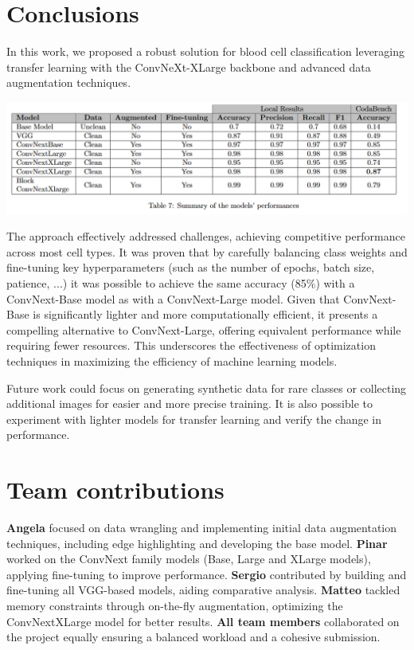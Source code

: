 \documentclass[10pt]{article}
\begin{document}
\begin{multicols}{2}
        

    \section{Conclusions}
    
    In this work, we proposed a robust solution for blood cell classification leveraging transfer learning with the ConvNeXt-XLarge backbone and advanced data augmentation techniques. 
    
    \begin{center}
        \includegraphics[width=\textwidth]{images/table.png} 
        \label{fig:Performance}
    \end{center}

    
    The approach effectively addressed challenges, achieving competitive performance across most cell types.
    It was proven that by carefully balancing class weights and fine-tuning key hyperparameters (such as the number of epochs, batch size, patience, ...) it was possible to achieve the same accuracy (85\%) with a ConvNext-Base model as with a ConvNext-Large model. Given that ConvNext-Base is significantly lighter and more computationally efficient, it presents a compelling alternative to ConvNext-Large, offering equivalent performance while requiring fewer resources. This underscores the effectiveness of optimization techniques in maximizing the efficiency of machine learning models.
    
    
    Future work could focus on generating synthetic data for rare classes or collecting additional images for easier and more precise training. It is also possible to experiment with lighter models for transfer learning and verify the change in performance.

    
    \section{Team contributions}
    \textbf{Angela} focused on data wrangling and implementing initial data augmentation techniques, including edge highlighting and developing the base model.
    \textbf{Pinar} worked on the ConvNext family models (Base, Large and XLarge models), applying fine-tuning to improve performance. 
    \textbf{Sergio} contributed by building and fine-tuning all VGG-based models, aiding comparative analysis. 
    \textbf{Matteo} tackled memory constraints through on-the-fly augmentation, optimizing the ConvNextXLarge model for better results.
    \textbf{All team members} collaborated on the project equally ensuring a balanced workload and a cohesive submission.


\end{multicols}
\end{document}
